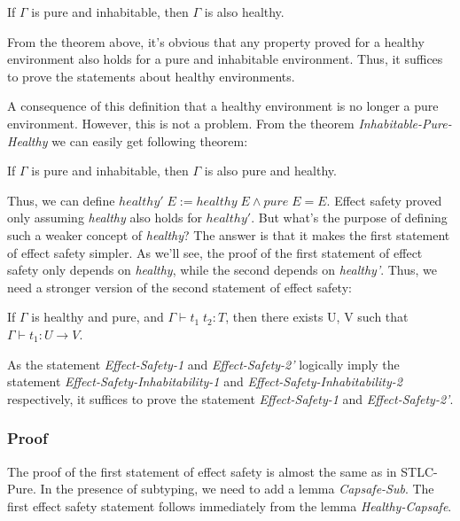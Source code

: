 \begin{theorem}
  If $\Gamma$ is pure and inhabitable, then $\Gamma$ is also healthy.
\end{theorem}

From the theorem above, it's obvious that any property proved for a
healthy environment also holds for a pure and inhabitable
environment. Thus, it suffices to prove the statements about healthy
environments.

A consequence of this definition that a healthy environment is no
longer a pure environment. However, this is not a problem. From the
theorem \emph{Inhabitable-Pure-Healthy} we can easily get following
theorem:

\begin{theorem}
  If $\Gamma$ is pure and inhabitable, then $\Gamma$ is also pure and
  healthy.
\end{theorem}

Thus, we can define
$healthy' \; E := healthy \; E \wedge pure \; E = E$. Effect safety
proved only assuming \emph{healthy} also holds for $healthy'$. But
what's the purpose of defining such a weaker concept of
\emph{healthy}? The answer is that it makes the first statement of
effect safety simpler. As we'll see, the proof of the first statement
of effect safety only depends on \emph{healthy}, while the second
depends on \emph{healthy'}. Thus, we need a stronger version of the
second statement of effect safety:

\begin{definition}
  If $\Gamma$ is healthy and pure, and $\Gamma \vdash t_1 \; t_2 : T$,
  then there exists U, V such that $\Gamma \vdash t_1 : U \to V$.
\end{definition}

As the statement \emph{Effect-Safety-1} and \emph{Effect-Safety-2'}
logically imply the statement \emph{Effect-Safety-Inhabitability-1}
and \emph{Effect-Safety-Inhabitability-2} respectively, it suffices to
prove the statement \emph{Effect-Safety-1} and
\emph{Effect-Safety-2'}.

\subsubsection{Proof}

The proof of the first statement of effect safety is almost the same
as in STLC-Pure. In the presence of subtyping, we need to add a lemma
\emph{Capsafe-Sub}.  The first effect safety statement follows
immediately from the lemma \emph{Healthy-Capsafe}.

